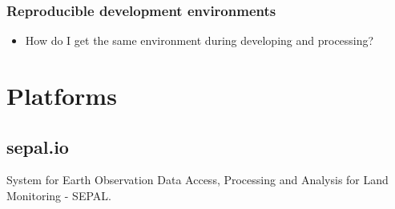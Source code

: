 \documentclass[aspectratio=169]{beamer}
\begin{document}
\begin{frame}
    \frametitle{Reproducible development environments}
    \begin{itemize}
        \item How do I get the same environment during developing and 
            processing?
    \end{itemize}
\end{frame}



\section{Platforms}



\subsection{sepal.io}

\begin{frame}
    System for Earth Observation Data Access, Processing and Analysis for Land
    Monitoring - SEPAL.
\end{frame}
\end{document}
